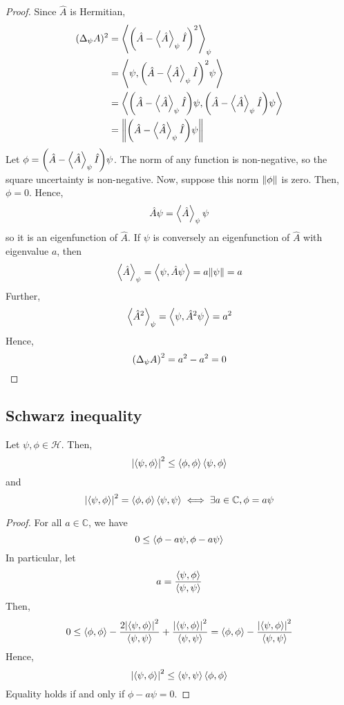 \begin{proof}
	Since \( \hat A \) is Hermitian,
	\begin{align*}
		(\Delta_\psi A)^2 & = \left\langle{\qty(\hat A - \left\langle{\hat A}\right\rangle_\psi \hat I)^2}\right\rangle_\psi                                              \\
		                  & = \left\langle{\psi, \qty(\hat A - \left\langle{\hat A}\right\rangle_\psi \hat I)^2 \psi}\right\rangle                                        \\
		                  & = \left\langle{\qty(\hat A - \left\langle{\hat A}\right\rangle_\psi \hat I)\psi, \qty(\hat A - \left\langle{\hat A}\right\rangle_\psi \hat I) \psi}\right\rangle \\
		                  & = \norm{\qty(\hat A - \left\langle{\hat A}\right\rangle_\psi \hat I)\psi}
	\end{align*}
	Let \( \phi = \qty(\hat A - \left\langle{\hat A}\right\rangle_\psi \hat I)\psi \).
	The norm of any function is non-negative, so the square uncertainty is non-negative.
	Now, suppose this norm \( \norm{\phi} \) is zero.
	Then, \( \phi = 0 \).
	Hence,
	\[
		\hat A \psi = \left\langle{\hat A}\right\rangle_\psi \psi
	\]
	so it is an eigenfunction of \( \hat A \).
	If \( \psi \) is conversely an eigenfunction of \( \hat A \) with eigenvalue \( a \), then
	\[
		\left\langle{\hat A}\right\rangle_\psi = \left\langle{\psi, \hat A \psi}\right\rangle = a \norm{\psi} = a
	\]
	Further,
	\[
		\left\langle{\hat A^2}\right\rangle_\psi = \left\langle{\psi, \hat A^2 \psi}\right\rangle = a^2
	\]
	Hence,
	\[
		\qty(\Delta_\psi A)^2 = a^2 - a^2 = 0
	\]
\end{proof}

\subsection{Schwarz inequality}
\begin{theorem}
	Let \( \psi, \phi \in \mathcal H \).
	Then,
	\[
		\abs{\left\langle{\psi, \phi}\right\rangle}^2 \leq \left\langle{\phi, \phi}\right\rangle \left\langle{\psi, \phi}\right\rangle
	\]
	and
	\[
		\abs{\left\langle{\psi, \phi}\right\rangle}^2 = \left\langle{\phi, \phi}\right\rangle \left\langle{\psi, \psi}\right\rangle \iff \exists a \in \mathbb C, \phi = a \psi
	\]
\end{theorem}
\begin{proof}
	For all \( a \in \mathbb C \), we have
	\[
		0 \leq \left\langle{\phi - a \psi, \phi - a \psi}\right\rangle
	\]
	In particular, let
	\[
		a = \frac{\left\langle{\psi, \phi}\right\rangle}{\left\langle{\psi, \psi}\right\rangle}
	\]
	Then,
	\[
		0 \leq \left\langle{\phi, \phi}\right\rangle - \frac{2 \abs{\left\langle{\psi, \phi}\right\rangle}^2}{\left\langle{\psi, \psi}\right\rangle} + \frac{\abs{\left\langle{\psi, \phi}\right\rangle}^2}{\left\langle{\psi, \psi}\right\rangle} = \left\langle{\phi, \phi}\right\rangle - \frac{\abs{\left\langle{\psi, \phi}\right\rangle}^2}{\left\langle{\psi, \psi}\right\rangle}
	\]
	Hence,
	\[
		\abs{\left\langle{\psi, \phi}\right\rangle}^2 \leq \left\langle{\psi, \psi}\right\rangle \left\langle{\phi, \phi}\right\rangle
	\]
	Equality holds if and only if \( \phi - a \psi = 0 \).
\end{proof}

